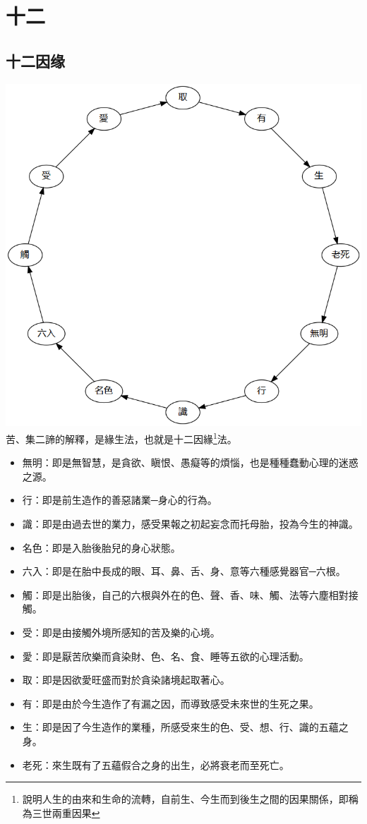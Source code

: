 \section{十二}

\subsection{十二因缘}
\includegraphics[scale=0.5]{释家/images/十二因缘.png}
苦、集二諦的解釋，是緣生法，也就是十二因緣\footnote{說明人生的由來和生命的流轉，自前生、今生而到後生之間的因果關係，即稱為三世兩重因果}法。
\begin{itemize}
  \item 無明：即是無智慧，是貪欲、瞋恨、愚癡等的煩惱，也是種種蠢動心理的迷惑之源。
  \item 行：即是前生造作的善惡諸業─身心的行為。
  \item 識：即是由過去世的業力，感受果報之初起妄念而托母胎，投為今生的神識。
  \item 名色：即是入胎後胎兒的身心狀態。
  \item 六入：即是在胎中長成的眼、耳、鼻、舌、身、意等六種感覺器官─六根。
  \item 觸：即是出胎後，自己的六根與外在的色、聲、香、味、觸、法等六塵相對接觸。
  \item 受：即是由接觸外境所感知的苦及樂的心境。
  \item 愛：即是厭苦欣樂而貪染財、色、名、食、睡等五欲的心理活動。
  \item 取：即是因欲愛旺盛而對於貪染諸境起取著心。
  \item 有：即是由於今生造作了有漏之因，而導致感受未來世的生死之果。
  \item 生：即是因了今生造作的業種，所感受來生的色、受、想、行、識的五蘊之身。
  \item 老死：來生既有了五蘊假合之身的出生，必將衰老而至死亡。
\end{itemize}
